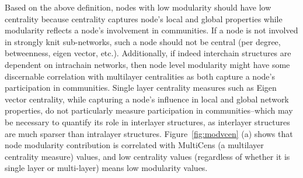 \documentclass[10pt,letterpaper]{article}
\begin{document}
Based on the above definition, nodes with low modularity should have low centrality because centrality captures node's local and global properties while modularity reflects a node's involvement in communities. If a node is not involved in strongly knit sub-networks, such a node should not be central (per degree, betweenness, eigen vector, etc.). Additionally, if indeed interchain structures are dependent on intrachain networks, then node level modularity might have some discernable correlation with multilayer centralities as both capture a node's participation in communities. Single layer centrality measures such as Eigen vector centrality, while capturing a node's influence in local and global network properties, do not particularly measure participation in communities--which may be necessary to quantify its role in interlayer structures, as interlayer structures are much sparser than intralayer structures. Figure~\ref{fig:modvcen} (a) shows that node modularity contribution is correlated with MultiCens (a multilayer centrality measure) values, and low centrality values (regardless of whether it is single layer or multi-layer) means low modularity values. 
\end{document}
